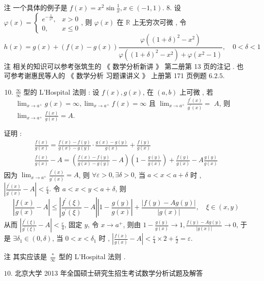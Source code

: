 \documentclass[10pt]{article}
\begin{document}
 注   一个具体的例子是  $f(x)=x^{2} \sin \frac{1}{x}, x \in(-1,1)$. 8.  设  $\varphi(x)=\left\{\begin{array}{ll}e^{-\frac{1}{x^{2}}}, & x>0 \\ 0, & x \leqslant 0\end{array}\right.$,  则  $\varphi(x)$  在  $\mathbb{R}$  上无穷次可微 ,  令 
$$
h(x)=g(x)+(f(x)-g(x)) \frac{\varphi\left((1+\delta)^{2}-x^{2}\right)}{\varphi\left((1+\delta)^{2}-x^{2}\right)+\varphi\left(x^{2}-1\right)}, \quad 0<\delta<1
$$
 注   相关的知识可以参考张筑生的 《 数学分析新讲 》 第二册第  13  页的注记 .  也可参考谢惠民等人的 《 数学分析   习题课讲义 》 上册第  171  页例题  $6.2 .5$.

\begin{enumerate}
  \setcounter{enumi}{9}
  \item $\frac{\infty}{\infty}$  型的  L'Hospital  法则 :  设  $f(x), g(x)$,  在  $(a, b)$  上可微 ,  若  $\lim _{x \rightarrow a^{+}} g(x)=\infty, \lim _{x \rightarrow a^{+}} f(x)=\infty$  且  $\lim _{x \rightarrow a^{+}} \frac{f^{\prime}(x)}{g^{\prime}(x)}=$ $A$,  则  $\lim _{x \rightarrow a^{+}} \frac{f(x)}{g(x)}=A$.
\end{enumerate}
 证明 :
$$
\begin{gathered}
\frac{f(x)}{g(x)}=\frac{f(x)-f(y)}{g(x)-g(y)} \cdot \frac{g(x)-g(y)}{g(x)}+\frac{f(y)}{g(x)} \\
\frac{f(x)}{g(x)}-A=\left(\frac{f(x)-f(y)}{g(x)-g(y)}-A\right)\left(1-\frac{g(y)}{g(x)}\right)+\frac{f(y)}{g(x)}-A \frac{g(y)}{g(x)}
\end{gathered}
$$
 因为  $\lim _{x \rightarrow a^{+}} \frac{f^{\prime}(x)}{g^{\prime}(x)}=A$,  则  $\forall \varepsilon>0, \exists \delta>0$,  当  $a<x<a+\delta$  时 , $\left|\frac{f^{\prime}(x)}{g^{\prime}(x)}-A\right|<\frac{\varepsilon}{4}$.  令  $a<x<y<a+\delta$,  则 
$$
\left|\frac{f(x)}{g(x)}-A\right| \leqslant\left|\frac{f^{\prime}(\xi)}{g^{\prime}(\xi)}-A\right|\left|1-\frac{g(y)}{g(x)}\right|+\frac{|f(y)-A g(y)|}{|g(x)|}, \quad \xi \in(x, y)
$$
 从而  $\left|\frac{f^{\prime}(\xi)}{g^{\prime}(\xi)}-A\right|<\frac{\varepsilon}{4}$,  固定  $y$,  令  $x \rightarrow a^{+}$,  则由  $1-\frac{g(y)}{g(x)} \rightarrow 1, \frac{f(y)-A g(y)}{|g(x)|} \rightarrow 0$, 于是  $\exists \delta_{1} \in(0, \delta)$,  当  $0<x<\delta_{1}$  时 , $\left|\frac{f(x)}{g(x)}-A\right|<\frac{\varepsilon}{4} \times 2+\frac{\varepsilon}{2}=\varepsilon$.

 注   其实应该是  $\frac{*}{\infty}$  型的  L'Hospital  法则 .

$10 .$  北京大学  2013  年全国硕士研究生招生考试数学分析试题及解答     
\end{document}
